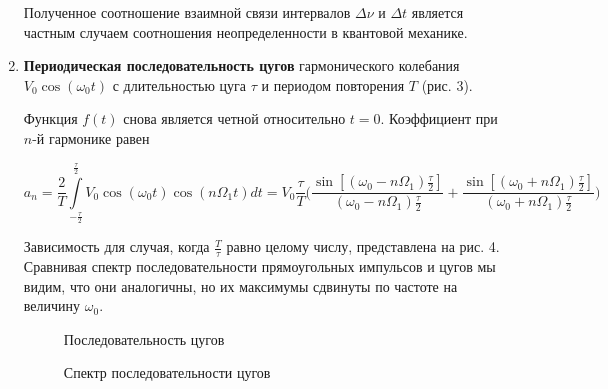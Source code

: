 \documentclass[12pt]{kiarticle}
\begin{document}
\begin{enumerate}
	Полученное соотношение взаимной связи интервалов $\Delta \nu$ и $\Delta t$ является
	частным случаем соотношения неопределенности в квантовой механике.
	
	\item \textbf{Периодическая последовательность цугов} гармонического колебания $V_{0}\cos(\omega_{0}t)$ с длительностью цуга $\tau$ и периодом повторения $T$ (рис. 3).
	
	Функция $f(t)$ снова является четной относительно $t=0$. Коэффициент при $n$-й гармонике равен
	
	$$a_{n}=\dfrac{2}{T}\int\limits_{-\frac{\tau}{2}}^{\frac{\tau}{2}}V_{0}\cos(\omega_{0}t)\cos(n \Omega_{1} t)dt=V_{0}\dfrac{\tau}{T} \bigg(\dfrac{\sin[(\omega_{0}-n\Omega_{1})\frac{\tau}{2}]}{(\omega_{0}-n\Omega_{1})\frac{\tau}{2}}+\dfrac{\sin[(\omega_{0}+n\Omega_{1})\frac{\tau}{2}]}{(\omega_{0}+n\Omega_{1})\frac{\tau}{2}} \bigg)$$ 
	
	Зависимость для случая, когда $\frac{T}{\tau}$ равно целому числу, представлена на рис. 4. Сравнивая спектр последовательности прямоугольных импульсов и цугов мы видим, что они аналогичны, но их максимумы сдвинуты по частоте на величину $\omega_{0}$.
	
	\begin{figure}[h]
		\begin{minipage}[h]{0.5\linewidth}
			\caption{Последовательность цугов}
		\end{minipage}
		\begin{minipage}[h]{0.5\linewidth}
			\caption{Спектр последовательности цугов}
		\end{minipage}
	\end{figure}


\end{enumerate}
\end{document}
